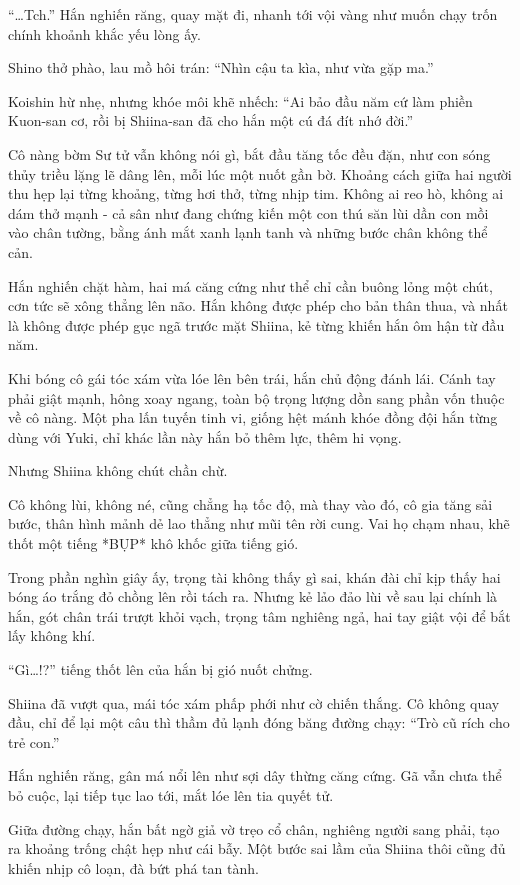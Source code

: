 \documentclass[../main.tex]{subfiles}
\begin{document}
``\dots Tch.'' Hắn nghiến răng, quay mặt đi, nhanh tới vội vàng như muốn chạy trốn chính khoảnh khắc yếu lòng ấy.

Shino thở phào, lau mồ hôi trán: ``Nhìn cậu ta kìa, như vừa gặp ma.''

Koishin hừ nhẹ, nhưng khóe môi khẽ nhếch: ``Ai bảo đầu năm cứ làm phiền Kuon-san cơ, rồi bị Shiina-san đã cho hắn một cú đá đít nhớ đời.''

Cô nàng bờm Sư tử vẫn không nói gì, bắt đầu tăng tốc đều đặn, như con sóng thủy triều lặng lẽ dâng lên, mỗi lúc một nuốt gần bờ. Khoảng cách giữa hai người thu hẹp lại từng khoảng, từng hơi thở, từng nhịp tim. Không ai reo hò, không ai dám thở mạnh - cả sân như đang chứng kiến một con thú săn lùi dần con mồi vào chân tường, bằng ánh mắt xanh lạnh tanh và những bước chân không thể cản.

Hắn nghiến chặt hàm, hai má căng cứng như thể chỉ cần buông lỏng một chút, cơn tức sẽ xông thẳng lên não.  Hắn không được phép cho bản thân thua, và nhất là không được phép gục ngã trước mặt Shiina, kẻ từng khiến hắn ôm hận từ đầu năm.

Khi bóng cô gái tóc xám vừa lóe lên bên trái, hắn chủ động đánh lái. Cánh tay phải giật mạnh, hông xoay ngang, toàn bộ trọng lượng dồn sang phần vốn thuộc về cô nàng. Một pha lấn tuyến tinh vi, giống hệt mánh khóe đồng đội hắn từng dùng với Yuki, chỉ khác lần này hắn bỏ thêm lực, thêm hi vọng.

Nhưng Shiina không chút chần chừ.

Cô không lùi, không né, cũng chẳng hạ tốc độ, mà thay vào đó, cô gia tăng sải bước, thân hình mảnh dẻ lao thẳng như mũi tên rời cung. Vai họ chạm nhau, khẽ thốt một tiếng *BỤP* khô khốc giữa tiếng gió.

Trong phần nghìn giây ấy, trọng tài không thấy gì sai, khán đài chỉ kịp thấy hai bóng áo trắng đỏ chồng lên rồi tách ra. Nhưng kẻ lảo đảo lùi về sau lại chính là hắn, gót chân trái trượt khỏi vạch, trọng tâm nghiêng ngả, hai tay giật vội để bắt lấy không khí.

``Gì\dots!?'' tiếng thốt lên của hắn bị gió nuốt chửng.

Shiina đã vượt qua, mái tóc xám phấp phới như cờ chiến thắng. Cô không quay đầu, chỉ để lại một câu thì thầm đủ lạnh đóng băng đường chạy: ``Trò cũ rích cho trẻ con.''

Hắn nghiến răng, gân má nổi lên như sợi dây thừng căng cứng. Gã vẫn chưa thể bỏ cuộc, lại tiếp tục lao tới, mắt lóe lên tia quyết tử.

Giữa đường chạy, hắn bất ngờ giả vờ trẹo cổ chân, nghiêng người sang phải, tạo ra khoảng trống chật hẹp như cái bẫy. Một bước sai lầm của Shiina thôi cũng đủ khiến nhịp cô loạn, đà bứt phá tan tành.
\end{document}
